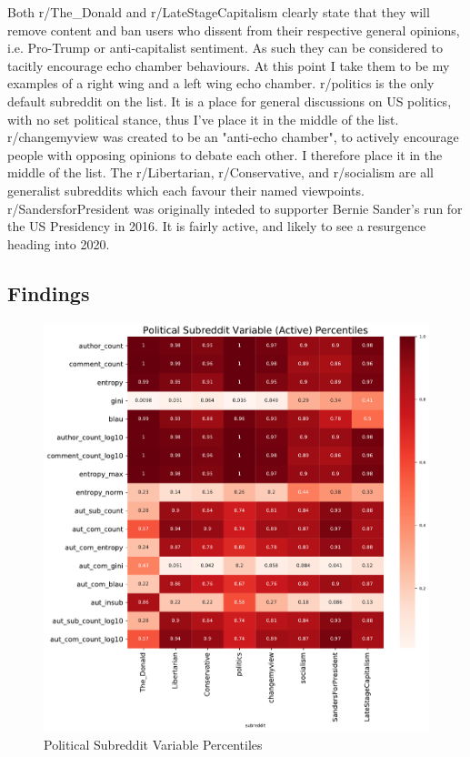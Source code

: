 Both r/The\_Donald and r/LateStageCapitalism clearly state that they will remove content and ban users who dissent from their respective general opinions, i.e. Pro-Trump or anti-capitalist sentiment. As such they can be considered to tacitly encourage echo chamber behaviours. At this point I take them to be my examples of a right wing and a left wing echo chamber. r/politics is the only default subreddit on the list. It is a place for general discussions on US politics, with no set political stance, thus I've place it in the middle of the list. r/changemyview was created to be an "anti-echo chamber", to actively encourage people with opposing opinions to debate each other. I therefore place it in the middle of the list. The r/Libertarian, r/Conservative, and r/socialism are all generalist subreddits which each favour their named viewpoints. r/SandersforPresident was originally inteded to supporter Bernie Sander's run for the US Presidency in 2016. It is fairly active, and likely to see a resurgence heading into 2020.

\subsection{Findings}

\begin{figure}
    \centering
    \includegraphics[scale=0.5]{latex/matrix/pol-heatmap.pdf}
    \caption{Political Subreddit Variable Percentiles}
    \label{pol-heatmap}
\end{figure}


